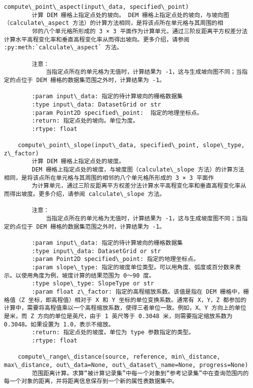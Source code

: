 \documentclass[11pt]{article}
\begin{document}
\begin{Verbatim}[commandchars=\\\{\}]
    compute\_point\_aspect(input\_data, specified\_point)
        计算 DEM 栅格上指定点处的坡向。 DEM 栅格上指定点处的坡向，与坡向图（calculate\_aspect 方法）的计算方法相同，是将该点所在单元格与其周围的相
        邻的八个单元格所形成的 3 × 3 平面作为计算单元，通过三阶反距离平方权差分法计算水平高程变化率和垂直高程变化率从而得出坡向。更多介绍，请参阅 :py:meth:`calculate\_aspect` 方法。
        
        注意：
            当指定点所在的单元格为无值时，计算结果为 -1，这与生成坡向图不同；当指定的点位于 DEM 栅格的数据集范围之外时，计算结果为 -1。
        
        :param input\_data: 指定的待计算坡向的栅格数据集
        :type input\_data: DatasetGrid or str
        :param Point2D specified\_point:  指定的地理坐标点。
        :return: 指定点处的坡向。单位为度。
        :rtype: float
    
    compute\_point\_slope(input\_data, specified\_point, slope\_type, z\_factor)
        计算 DEM 栅格上指定点处的坡度。
        DEM 栅格上指定点处的坡度，与坡度图（calculate\_slope 方法）的计算方法相同，是将该点所在单元格与其周围的相邻的八个单元格所形成的 3 × 3 平面作
        为计算单元，通过三阶反距离平方权差分法计算水平高程变化率和垂直高程变化率从而得出坡度。更多介绍，请参阅 calculate\_slope 方法。
        
        注意：
            当指定点所在的单元格为无值时，计算结果为 -1，这与生成坡度图不同；当指定的点位于 DEM 栅格的数据集范围之外时，计算结果为 -1。
        
        :param input\_data: 指定的待计算坡向的栅格数据集
        :type input\_data: DatasetGrid or str
        :param Point2D specified\_point: 指定的地理坐标点。
        :param slope\_type: 指定的坡度单位类型。可以用角度、弧度或百分数来表示。以使用角度为例，坡度计算的结果范围为 0～90 度。
        :type slope\_type: SlopeType or str
        :param float z\_factor: 指定的高程缩放系数。该值是指在 DEM 栅格中，栅格值（Z 坐标，即高程值）相对于 X 和 Y 坐标的单位变换系数。通常有 X，Y，Z 都参加的计算中，需要将高程值乘以一个高程缩放系数，使得三者单位一致。例如，X、Y 方向上的单位是米，而 Z 方向的单位是英尺，由于 1 英尺等于 0.3048 米，则需要指定缩放系数为 0.3048。如果设置为 1.0，表示不缩放。
        :return: 指定点处的坡度。单位为 type 参数指定的类型。
        :rtype: float
    
    compute\_range\_distance(source, reference, min\_distance, max\_distance, out\_data=None, out\_dataset\_name=None, progress=None)
        范围距离计算。求算“被计算记录集”中每一个对象到“参考记录集”中在查询范围内的每一个对象的距离，并将距离信息保存到一个新的属性表数据集中。
        

\end{Verbatim}
\end{document}
